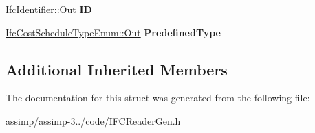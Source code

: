 \begin{DoxyCompactItemize}
\item 
\hypertarget{struct_assimp_1_1_i_f_c_1_1_ifc_cost_schedule_ae0a24504fd7ba88804f799f3eff4595a}{Ifc\+Identifier\+::\+Out {\bfseries I\+D}}\label{struct_assimp_1_1_i_f_c_1_1_ifc_cost_schedule_ae0a24504fd7ba88804f799f3eff4595a}

\item 
\hypertarget{struct_assimp_1_1_i_f_c_1_1_ifc_cost_schedule_aeaffeeebefd04ca050046f2cdb9740ef}{\hyperlink{classboost_1_1shared__ptr}{Ifc\+Cost\+Schedule\+Type\+Enum\+::\+Out} {\bfseries Predefined\+Type}}\label{struct_assimp_1_1_i_f_c_1_1_ifc_cost_schedule_aeaffeeebefd04ca050046f2cdb9740ef}

\end{DoxyCompactItemize}
\subsection*{Additional Inherited Members}


The documentation for this struct was generated from the following file\+:\begin{DoxyCompactItemize}
\item 
assimp/assimp-\/3../code/I\+F\+C\+Reader\+Gen.\+h\end{DoxyCompactItemize}
